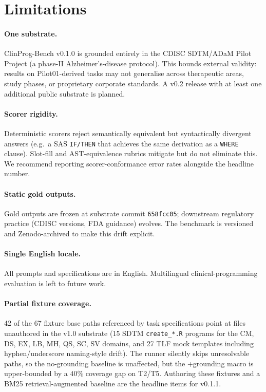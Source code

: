 \section{Limitations}
\label{sec:limitations}

\paragraph{One substrate.} ClinProg-Bench v0.1.0 is grounded entirely in the
CDISC SDTM/ADaM Pilot Project (a phase-II Alzheimer's-disease protocol).
This bounds external validity: results on Pilot01-derived tasks may not
generalise across therapeutic areas, study phases, or proprietary corporate
standards. A v0.2 release with at least one additional public substrate is
planned.

\paragraph{Scorer rigidity.} Deterministic scorers reject semantically
equivalent but syntactically divergent answers (e.g.\ a SAS \texttt{IF/THEN}
that achieves the same derivation as a \texttt{WHERE} clause). Slot-fill and
AST-equivalence rubrics mitigate but do not eliminate this. We recommend
reporting scorer-conformance error rates alongside the headline number.

\paragraph{Static gold outputs.} Gold outputs are frozen at substrate commit
\texttt{658fcc05}; downstream regulatory practice (CDISC versions, FDA
guidance) evolves. The benchmark is versioned and Zenodo-archived to make
this drift explicit.

\paragraph{Single English locale.} All prompts and specifications are in
English. Multilingual clinical-programming evaluation is left to future work.

\paragraph{Partial fixture coverage.} 42 of the 67 fixture base paths
referenced by task specifications point at files unauthored in the v1.0
substrate (15 SDTM \texttt{create\_*.R} programs for the CM, DS, EX, LB,
MH, QS, SC, SV domains, and 27 TLF mock templates including
hyphen/underscore naming-style drift). The runner silently skips
unresolvable paths, so the no-grounding baseline is unaffected, but the
+grounding macro is upper-bounded by a $40\%$ coverage gap on T2/T5.
Authoring these fixtures and a BM25 retrieval-augmented baseline are the
headline items for v0.1.1.

